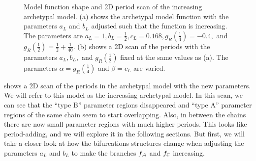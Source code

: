 \begin{figure}
	\centering
	\caption[Model function shape and 2D period scan of the increasing archetypal model]{
		Model function shape and 2D period scan of the increasing archetypal model.
		(a) shows the archetypal model function with the parameters $a_L$ and $b_L$ adjusted such that the function is increasing.
		The parameters are $a_L = 1, b_L = \frac{1}{2}, c_L = 0.168, g_R\left(\frac{1}{4}\right) = -0.4 ,$ and $g_R\left(\frac{1}{2}\right) = \frac{1}{2} + \frac{1}{40}$.
		(b) shows a 2D scan of the periods with the parameters $a_L, b_L,$ and $g_R\left(\frac{1}{2}\right)$ fixed at the same values as (a).
		The parameters $\alpha = g_R\left(\frac{1}{4}\right)$ and $\beta = c_L$ are varied.
	}
\end{figure}

 shows a 2D scan of the periods in the archetypal model with the new parameters.
We will refer to this model as the increasing archetypal model.
In this scan, we can see that the ``type B'' parameter regions disappeared and ``type A'' parameter regions of the same chain seem to start overlapping.
Also, in between the chains there are now small parameter regions with much higher periods.
This looks like period-adding, and we will explore it in the following sections.
But first, we will take a closer look at how the bifurcations structures change when adjusting the parameters $a_L$ and $b_L$ to make the branches $f_{\mathcal{A}}$ and $f_{\mathcal{C}}$ increasing.

